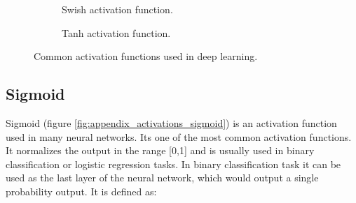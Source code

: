 \begin{figure*}
\begin{subfigure}[b]{0.4\textwidth}
        \centering 
        \caption[]%
        {{\small Swish activation function.}}    
        \label{fig:appendix_activations_swish}
    \end{subfigure}
    \hfill
    \begin{subfigure}[b]{0.4\textwidth}   
        \centering 
        \caption[]%
        {{\small Tanh activation function.}}    
        \label{fig:appendix_activations_tanh}
    \end{subfigure}
    \caption []%
    {\small Common activation functions used in deep learning.} 
\end{figure*}







\subsection*{Sigmoid}

Sigmoid (figure \ref{fig:appendix_activations_sigmoid}) is an activation function used in many neural networks. Its one of the most common activation functions. It normalizes the output in the range [0,1] and is usually used in binary classification or logistic regression tasks. In binary classification task it can be used as the last layer of the neural network, which would output a single probability output. It is defined as:

